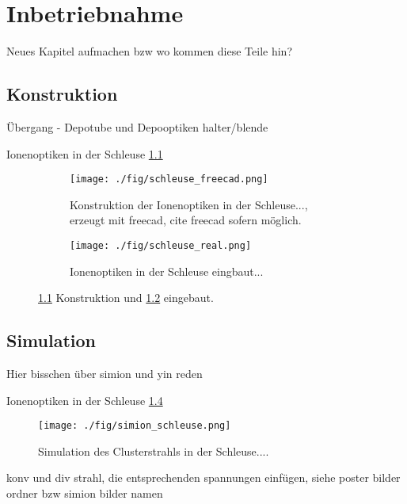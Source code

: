\chapter{Inbetriebnahme}
Neues Kapitel aufmachen bzw wo kommen diese Teile hin?
\section{Konstruktion}
Übergang - Depotube und Depooptiken halter/blende

Ionenoptiken in der Schleuse \ref{fig:schleuse_freecad} 

\begin{figure}
    \begin{subfigure}[t]{0.475\textwidth}
      \texttt{[image: ./fig/schleuse\_freecad.png]}
      \caption{Konstruktion der Ionenoptiken in der Schleuse..., erzeugt mit freecad, cite freecad sofern möglich.}
      \label{fig:schleuse_freecad}
    \end{subfigure}\hfill
    \begin{subfigure}[t]{0.475\textwidth}
      \texttt{[image: ./fig/schleuse\_real.png]}
      \caption{Ionenoptiken in der Schleuse eingbaut...}
      \label{fig:schleuse_real}
    \end{subfigure}
    \caption{\ref{fig:schleuse_freecad} Konstruktion und \ref{fig:schleuse_real} eingebaut.} 
    \label{fig:schleuse_innen}
\end{figure}


\section{Simulation}
Hier bisschen über simion \cite{Manura.2008} und yin \cite{Yin.2007} reden

Ionenoptiken in der Schleuse \ref{fig:simion_schleuse} 

\begin{figure}
    \centering
    \texttt{[image: ./fig/simion\_schleuse.png]}
    \caption{Simulation des Clusterstrahls in der Schleuse....}
    \label{fig:simion_schleuse}
\end{figure}
konv und div strahl, die entsprechenden spannungen einfügen, siehe poster bilder ordner bzw simion bilder namen

